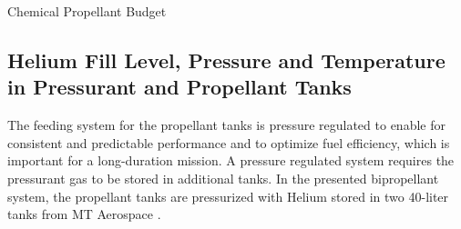 \documentclass[conference]{IEEEtran}
\begin{document}
\begin{table}[H]
\centering
\caption{Chemical Propellant Budget}
\label{tab:budget-prop-chem}
\end{table}

\subsection{Helium Fill Level, Pressure and Temperature in Pressurant and Propellant Tanks}
\label{subsection:PressCalc}

The feeding system for the propellant tanks is pressure regulated to enable for consistent and predictable performance and to optimize fuel efficiency, which is important for a long-duration mission. A pressure regulated system requires the pressurant gas to be stored in additional tanks. In the presented bipropellant system, the propellant tanks are pressurized with Helium stored in two 40-liter tanks from MT Aerospace \cite{MTTankka92:online}. 
\end{document}
